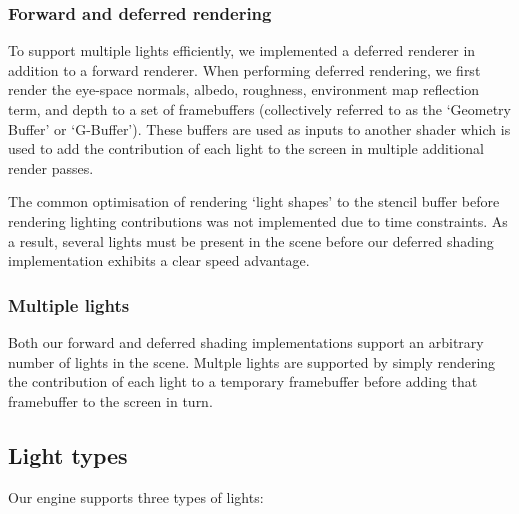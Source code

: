 \documentclass[11pt]{scrartcl} %
\begin{document}
        \subsubsection{Forward and deferred rendering}

            To support multiple lights efficiently, we implemented a deferred
            renderer in addition to a forward renderer. When performing
            deferred rendering, we first render the eye-space normals, albedo,
            roughness, environment map reflection term, and depth to a set of
            framebuffers (collectively referred to as the `Geometry Buffer' or
            `G-Buffer'). These buffers are used as inputs to another shader
            which is used to add the contribution of each light to the screen
            in multiple additional render passes.

            The common optimisation of rendering `light shapes' to the stencil
            buffer before rendering lighting contributions was not implemented
            due to time constraints. As a result, several lights must be
            present in the scene before our deferred shading implementation
            exhibits a clear speed advantage.

        \subsubsection{Multiple lights}

            Both our forward and deferred shading implementations support an
            arbitrary number of lights in the scene. Multple lights are
            supported by simply rendering the contribution of each light to a
            temporary framebuffer before adding that framebuffer to the screen
            in turn.

        \subsection{Light types}

            Our engine supports three types of lights:
\end{document}
